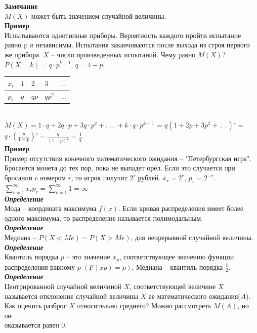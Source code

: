 \documentclass[russian, 12pt, fleqn]{article}
\begin{document}
\textbf{Замечание\ } \\
$M(X)$ может быть значением случайной величины.\\
\textbf{Пример\ }\\
Испытываются однотипные приборы. Вероятность каждого пройти испытание равно p и независимы. Испытания заканчиваются после выхода из строя первого же прибора. $X$ -- число произведенных испытаний. Чему равно $M(X)$?\\
$P(X=k) = q\cdot p ^{k - 1}$, $q = 1 - p$.\\
\begin{tabular}[b]{ | l | l | l | l | l |   }
\hline
$x_i$&$1$&$2$&$3$&$...$\\
\hline
$p_i$&$q$&$qp$&$qp^2$&...\\
\hline
\end{tabular}\\
$M(X) = 1\cdot q + 2q\cdot p + 3 q \cdot p^2 + .\ .\ .\ +k\cdot q\cdot p^{k-1}$ = $q(1+2p+3p^2 + \ .\ .\ )'$ = $q\cdot(\frac{p}{1-p}) ' = \frac{q}{{(1-p)}^2} = \frac{1}{q}$\\
\textbf{Пример\ }\\
 Пример отсутствия конечного математического ожидания -- "Петербургская игра". Бросается монета до тех пор, пока не выпадет орёл. Если это случается при бросании c номером $r$, то игрок получит $2^r$ рублей. $x_r=2^r$, $p_r=2^{-r}$.\\ $\sum\limits_{r = 1}^{\infty}  x_rp_r = \sum\limits_{r = 1}^{\infty} 1 = \infty$\\
\textit{\textbf{Определение}}\\
Мода -- координата максимума $f(x)$. Если кривая распределения имеет более одного максимума, то распределение называется полимодальным.\\
\textit{\textbf{Определение}}\\
Медиана -- $P(X<Me) = P(X>Me)$, для непрерывной случайной величины.\\
\textit{\textbf{Определение}}\\
Квантиль порядка $p$ -- это значение $x_p$, соответствующее значению функции распределения равному $p$ $(F(xp)=p)$. Медиана -- квантиль порядка $\frac{1}{2}$.\\
\textit{\textbf{Определение}}\\
Центрированной случайной величиной $X$, соответствующей величине $X$ называется отклонение случайной величины $X$ ее математического ожидания($A$).
Как оценить разброс $X$ относительно среднего? Можно рассмотреть $M(A)$, но он\\ оказывается равен 0.\\
\end{document}
